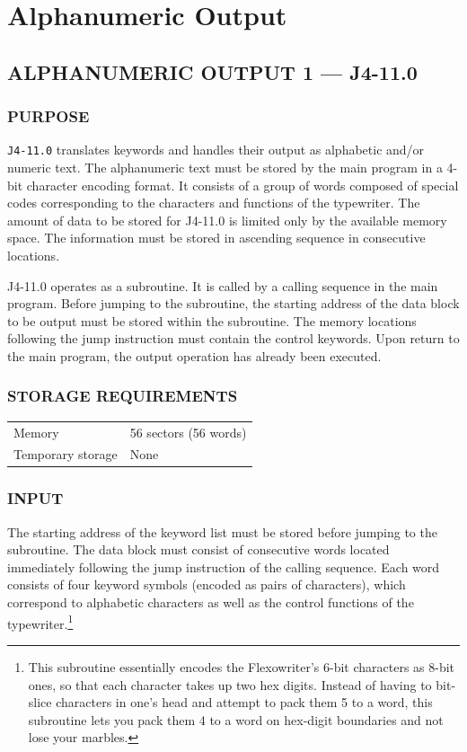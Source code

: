 \section{Alphanumeric Output}
\subsection*{ALPHANUMERIC OUTPUT 1 --- J4-11.0}
\label{sec:alphanumeric-output-1}

\subsubsection*{PURPOSE}
\texttt{J4-11.0} translates keywords and handles their output as alphabetic and/or numeric text. The alphanumeric text must be stored by the main program in a 4-bit character encoding format. It consists of a group of words composed of special codes corresponding to the characters and functions of the typewriter. The amount of data to be stored for J4-11.0 is limited only by the available memory space. The information must be stored in ascending sequence in consecutive locations.

J4-11.0 operates as a subroutine. It is called by a calling sequence in the main program. Before jumping to the subroutine, the starting address of the data block to be output must be stored within the subroutine. The memory locations following the jump instruction must contain the control keywords. Upon return to the main program, the output operation has already been executed.

\subsubsection*{STORAGE REQUIREMENTS}
\begin{center}
\begin{tabular}{ll}
    \toprule
    Memory & 56 sectors (56 words) \\
    Temporary storage    & None \\
    \bottomrule
\end{tabular}
\end{center}

\subsubsection*{INPUT}
The starting address of the keyword list must be stored before jumping to the subroutine. The data block must consist of consecutive words located immediately following the jump instruction of the calling sequence. Each word consists of four keyword symbols (encoded as pairs of characters), which correspond to alphabetic characters as well as the control functions of the typewriter.\footnote{This subroutine essentially encodes the Flexowriter's 6-bit characters as 8-bit ones, so that each character takes up two hex digits. Instead of having to bit-slice characters in one's head and attempt to pack them 5 to a word, this subroutine lets you pack them 4 to a word on hex-digit boundaries and not lose your marbles.} 

